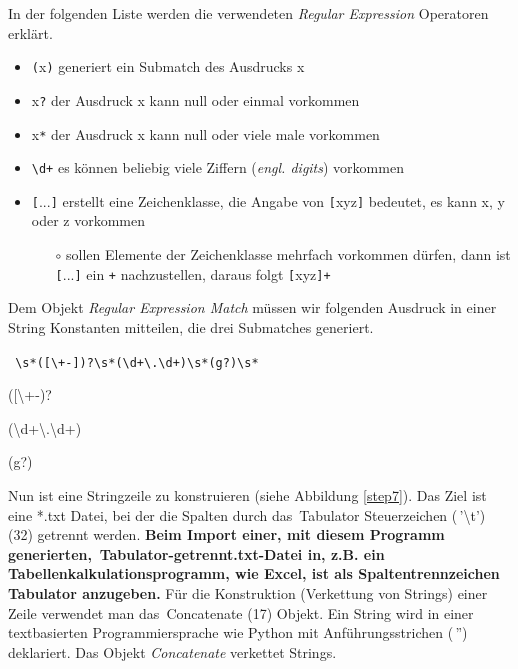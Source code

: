 { In der folgenden Liste werden die verwendeten \textit{Regular Expression} Operatoren erklärt.

\begin{itemize} %
\singlespacing
\item \texttt{(}x\texttt{)} generiert ein Submatch des Ausdrucks x
\item x\texttt{?} der Ausdruck x kann null oder einmal vorkommen
\item x\texttt{*} der Ausdruck x kann null oder viele male vorkommen
\item \texttt{\textbackslash d+} es können beliebig viele Ziffern (\textit{engl. digits}) vorkommen
\item \texttt{[}...\texttt{]} erstellt eine Zeichenklasse, die Angabe von \texttt{[}xyz\texttt{]} bedeutet, es kann x, y oder z vorkommen
	\begin{itemize} 
		\item[\small $\circ$] sollen Elemente der Zeichenklasse mehrfach vorkommen dürfen, dann ist \texttt{[}...\texttt{]} ein \texttt{+} nachzustellen, daraus folgt \texttt{[}xyz\texttt{]+} 
\end{itemize}
\end{itemize}

\noindent Dem Objekt \textit{Regular Expression Match} müssen wir folgenden Ausdruck in einer String Konstanten mitteilen, die drei Submatches generiert.

\begin{center} %
\texttt{
\textbackslash s*([\textbackslash +-])?\textbackslash s*(\textbackslash d+\textbackslash .\textbackslash d+)\textbackslash s*(g?)\textbackslash s*
}
\end{center}

\begin{description}  %
\singlespacing
\item[Submatch 1] ([\textbackslash +-)?
\item[Submatch 2] (\textbackslash d+\textbackslash .\textbackslash d+)
\item[Submatch 3] (g?)
\end{description}

\noindent Nun ist eine Stringzeile zu konstruieren (siehe Abbildung \ref{step7}). Das Ziel ist eine *.txt Datei, bei der die Spalten durch das \,{\Menlo Tabulator} Steuerzeichen (\,{\Menlo '\textbackslash t'}) (32) getrennt werden. \textbf{Beim Import einer, mit diesem Programm generierten, \,{\Menlo Ta\-bu\-lator-getrennt.txt}-Datei in, z.B. ein Tabellenkalkulationsprogramm, wie Excel, ist als Spaltentrennzeichen Tabulator anzugeben.} Für die Konstruktion (Verkettung von Strings) einer Zeile verwendet man das \,{\Menlo Concatenate} (17) Objekt. Ein String wird in einer textbasierten Programmiersprache wie Python mit Anführungsstrichen (\,{\Menlo ''}) deklariert. Das Objekt \textit{Concatenate} verkettet Strings.

}
